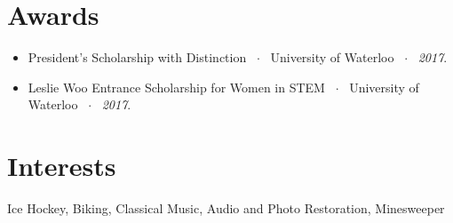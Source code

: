 \documentclass[oneside, 11pt]{memoir}
\newcommand{\entryProject}[4]{
  \begin{adjustwidth}{0.4em}{0em}%
  \textbf{#1}~$\cdot$~#2\sourceatright{\Date \small #3}%
  \begin{adjustwidth}{0.5em}{2.75em}
    \begin{flushleft}
      {
        \Merriweather \small
        #4
      }%
    \end{flushleft}
  \end{adjustwidth}
  \end{adjustwidth}
}
\newcommand{\entryList}[1]{
  \begin{adjustwidth}{0.4em}{0em}%
  \begin{adjustwidth}{0.5em}{2.75em}
    \begin{flushleft}
      {
        \Merriweather \small
        #1
      }%
    \end{flushleft}
  \end{adjustwidth}
  \end{adjustwidth}
}
\begin{document}

\section*{Awards}

\entryList{
  \begin{itemize}
    \item{
        President's Scholarship with Distinction ~$\cdot$~ University of Waterloo ~$\cdot$~ \emph{2017}.
    }
    \item{
        Leslie Woo Entrance Scholarship for Women in STEM ~$\cdot$~ University of Waterloo ~$\cdot$~ \emph{2017}.
    }
  \end{itemize}
}


\section*{Interests}
{
    \Merriweather \small \quad \quad \quad Ice Hockey, Biking, Classical Music, Audio and Photo Restoration, Minesweeper
}


%



\end{document}
